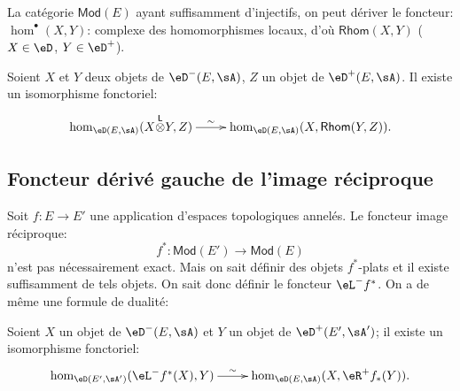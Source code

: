 La catégorie $\mathsf{Mod}(E)$ ayant suffisamment d'injectifs, on peut 
dériver le foncteur: $\hom^\bullet(X,Y)$: complexe des homomorphismes locaux,  
d'où $\mathsf{Rhom}(X,Y)$ ($X\in \eD$, $Y\in \eD^+$). 

Soient $X$ et $Y$ deux objets de $\eD^-(E,\sA)$, $Z$ un objet de 
$\eD^+(E,\sA)$. Il existe un isomorphisme fonctoriel: 
\[\xymatrix{
  \hom_{\eD(E,\sA)}(X\lotimes Y,Z) \ar[r]^-\sim 
    &\hom_{\eD(E,\sA)}(X,\mathsf{Rhom}(Y,Z)) \text{.}
}\]










\subsection{Foncteur dérivé gauche de l'image réciproque}\label{VIII:6-3}

Soit $f:E\to E'$ une application d'espaces topologiques annelés. Le 
foncteur image réciproque: 
\[
  f^\ast:\mathsf{Mod}(E') \to \mathsf{Mod}(E) 
\]
n'est pas nécessairement exact. Mais on sait définir des objets 
$f^\ast$-plats et il existe suffisamment de tels objets. On sait donc 
définir le foncteur $\eL^- f^\ast$. On a de même une formule de dualité: 

Soient $X$ un objet de $\eD^-(E,\sA)$ et $Y$ un objet de 
$\eD^+(E',\sA')$; il existe un isomorphisme fonctoriel: 
\[\xymatrix{
  \hom_{\eD(E',\sA')}(\eL^- f^\ast(X),Y) \ar[r]^-\sim 
    & \hom_{\eD(E,\sA)}(X,\eR^+ f_\ast(Y)) \text{.}
}\]
















